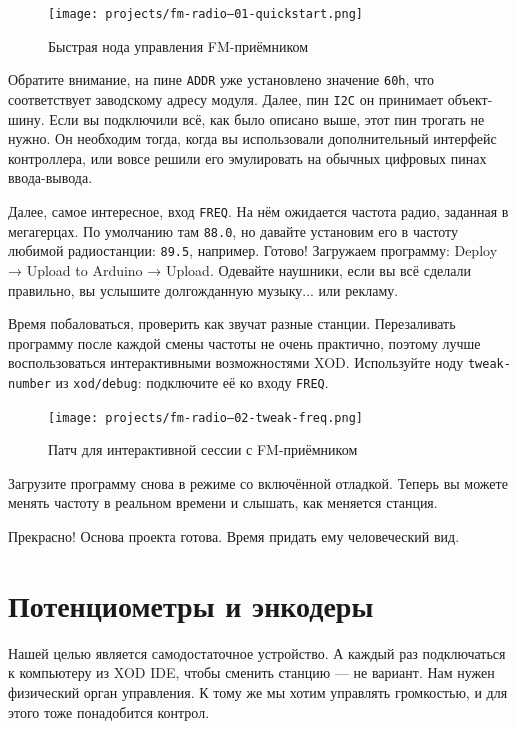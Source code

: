 \begin{figure}
\centering
\texttt{[image: projects/fm-radio--01-quickstart.png]}
\caption{Быстрая нода управления FM-приёмником}
\end{figure}

Обратите внимание, на пине \texttt{ADDR} уже установлено значение \texttt{60h}, что соответствует заводскому адресу модуля. Далее, пин \texttt{I2C} он принимает объект-шину. Если вы подключили всё, как было описано выше, этот пин трогать не нужно. Он необходим тогда, когда вы использовали дополнительный интерфейс контроллера, или вовсе решили его эмулировать на обычных цифровых пинах ввода-вывода.


Далее, самое интересное, вход \texttt{FREQ}. На нём ожидается частота радио, заданная в мегагерцах. По умолчанию там \texttt{88.0}, но давайте установим его в частоту любимой радиостанции: \texttt{89.5}, например.  Готово! Загружаем программу: Deploy → Upload to Arduino → Upload. Одевайте наушники, если вы всё сделали правильно, вы услышите долгожданную музыку... или рекламу.

Время побаловаться, проверить как звучат разные станции. Перезаливать программу после каждой смены частоты не очень практично, поэтому лучше воспользоваться интерактивными возможностями XOD. Используйте ноду \texttt{tweak-number} из \texttt{xod/debug}: подключите её ко входу \texttt{FREQ}.

\begin{figure}
\centering
\texttt{[image: projects/fm-radio--02-tweak-freq.png]}
\caption{Патч для интерактивной сессии с FM-приёмником}
\end{figure}

Загрузите программу снова в режиме со включённой отладкой. Теперь вы можете менять частоту в реальном времени и слышать, как меняется станция.

Прекрасно! Основа проекта готова. Время придать ему человеческий вид.

\section{Потенциометры и энкодеры}

Нашей целью является самодостаточное устройство. А каждый раз подключаться к компьютеру из XOD IDE, чтобы сменить станцию — не вариант. Нам нужен физический орган управления. К тому же мы хотим управлять громкостью, и для этого тоже понадобится контрол.

